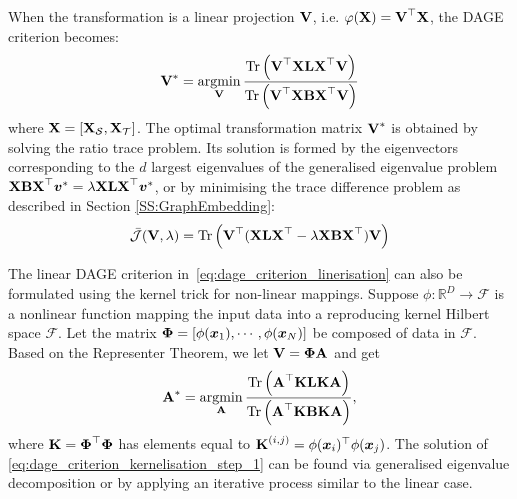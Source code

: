 \documentclass[journal]{IEEEtran}
\renewcommand{\vector}[1]{\ensuremath{\bm{\lowercase{#1}}}}
\renewcommand{\matrix}[1]{\ensuremath{\bm{\mathbf{\uppercase{#1}}}}}
\newcommand{\vx}{\vector{x}}
\newcommand{\mX}{\matrix{x}}
\DeclareMathOperator*{\argmin}{argmin} \DeclareMathOperator*{\argmax}{argmax}
\newcommand{\Src}{\mathcal{S}} \newcommand{\Tgt}{\mathcal{T}}
\newcommand{\tr}{\text{Tr}}
\begin{document}
When the transformation is a linear projection $\matrix{V}$, i.e. $\varphi(\mX) = \matrix{V}^\top \mX$, the DAGE criterion becomes:
\begin{align}
  \matrix{V}^{*} 
  =
  \argmin_{\matrix{V}}
  \frac{
    \tr
    \left(
        \matrix{V}^\top
        \mX
        \matrix{L}
        \mX^{\top}
        \matrix{V}
    \right)
  }{
    \tr
    \left(
        \matrix{V}^\top
        \mX
        \matrix{B}
        \mX^{\top}
        \matrix{V}
    \right)
  }
  \label{eq:dage_criterion_linerisation}
\end{align}
where $\mX = [\mX_\Src, \mX_\Tgt]$. The optimal transformation matrix $\matrix{V}^{*}$ is obtained by solving the ratio trace problem. Its solution is formed by the eigenvectors corresponding to the $d$ largest eigenvalues of the generalised eigenvalue problem $\matrix{X} \matrix{B} \matrix{X}^\top \vector{v}^{*} = \lambda \matrix{X} \matrix{L} \matrix{X}^\top \vector{v}^{*}$, or by minimising the trace difference problem as described in Section \ref{SS:GraphEmbedding}:
\begin{equation}
    \bar{\mathcal{J}}(\matrix{V},\lambda) = \tr \left( \matrix{V}^\top ( \matrix{X} \matrix{L} \matrix{X}^\top - \lambda \matrix{X} \matrix{B} \matrix{X}^\top) \matrix{V} \right) \label{Eq:TraceDifferenceDAGE}
\end{equation}


The linear DAGE criterion in~\cref{eq:dage_criterion_linerisation} can also be formulated using the kernel trick for non-linear mappings. Suppose $\phi: \mathbb{R}^{D} \to \mathcal{F}$ is a nonlinear function mapping the input data into a reproducing kernel Hilbert space $\mathcal{F}$. Let the matrix $\matrix{\Phi} = [\phi(\vx_1), \cdots, \phi(\vx_N)]$ be composed of data in $\mathcal{F}$. Based on the Representer Theorem, we let $\matrix{V} = \matrix{\Phi}\matrix{A}$ and get
\begin{align}
  \matrix{A}^{*}
  =
  \argmin_{\matrix{A}}
  \frac{
    \tr
    \left(
        \matrix{A}^\top \matrix{K}
        \matrix{L}
        \matrix{K}\matrix{A}
    \right)
  }{
    \tr
    \left(
        \matrix{A}^\top \matrix{K}
        \matrix{B}
        \matrix{K}\matrix{A}
    \right)
  },
  \label{eq:dage_criterion_kernelisation_step_1}
\end{align}
where $\matrix{K} = \matrix{\Phi}^\top \matrix{\Phi}$ has elements equal to $\matrix{K}^{(i,j)} = \phi(\vx_i)^\top \phi(\vx_j)$. The solution of \cref{eq:dage_criterion_kernelisation_step_1} can be found via generalised eigenvalue decomposition or by applying an iterative process similar to the linear case.
\end{document}
